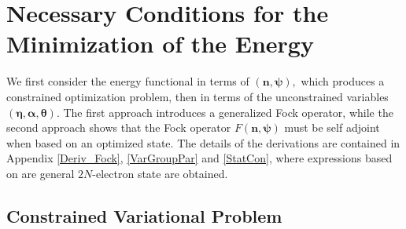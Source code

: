 \documentclass[titlepage]{article}%
\begin{document}
\section{Necessary Conditions for the Minimization of the Energy
\label{Evariation}}

We first consider the energy functional in terms of $\left(
\bm{n,\psi }\right)  ,$ which produces a constrained optimization problem,
then in terms of the unconstrained variables $\left(
\bm{\eta},\bm{\alpha },\bm{\theta}\right)  $. The first approach introduces a
generalized Fock operator, while the second approach shows that the Fock
operator $F\left(  \bm{n,\psi}\right)  $ must be self adjoint when based on an
optimized state. The details of the derivations are contained in Appendix
\ref{Deriv_Fock}, \ref{VarGroupPar} and \ref{StatCon}, where expressions based
on are general $2N$-electron state are obtained.

\subsection{Constrained Variational Problem\label{CVP}}
\end{document}
